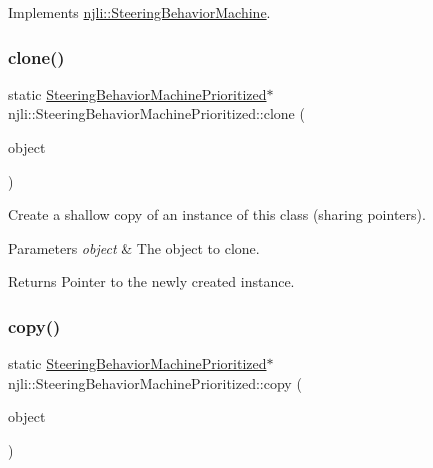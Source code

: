 Implements \mbox{\hyperlink{classnjli_1_1_steering_behavior_machine_aea431466acb4ef73220206bbcd515a9a}{njli\+::\+Steering\+Behavior\+Machine}}.

\mbox{\label{classnjli_1_1_steering_behavior_machine_prioritized_a5b86567620dab0bd1a238c222efcfd63}} 
\subsubsection{\texorpdfstring{clone()}{clone()}}
{\footnotesize\ttfamily static \mbox{\hyperlink{classnjli_1_1_steering_behavior_machine_prioritized}{Steering\+Behavior\+Machine\+Prioritized}}$\ast$ njli\+::\+Steering\+Behavior\+Machine\+Prioritized\+::clone (\begin{DoxyParamCaption}\item[{const \mbox{\hyperlink{classnjli_1_1_steering_behavior_machine_prioritized}{Steering\+Behavior\+Machine\+Prioritized}} \&}]{object }\end{DoxyParamCaption})\hspace{0.3cm}{\ttfamily [static]}}

Create a shallow copy of an instance of this class (sharing pointers).


\begin{DoxyParams}{Parameters}
{\em object} & The object to clone.\\
\hline
\end{DoxyParams}
\begin{DoxyReturn}{Returns}
Pointer to the newly created instance. 
\end{DoxyReturn}
\mbox{\label{classnjli_1_1_steering_behavior_machine_prioritized_a639b1ed7827dcf456f205d635632ae5f}} 
\subsubsection{\texorpdfstring{copy()}{copy()}}
{\footnotesize\ttfamily static \mbox{\hyperlink{classnjli_1_1_steering_behavior_machine_prioritized}{Steering\+Behavior\+Machine\+Prioritized}}$\ast$ njli\+::\+Steering\+Behavior\+Machine\+Prioritized\+::copy (\begin{DoxyParamCaption}\item[{const \mbox{\hyperlink{classnjli_1_1_steering_behavior_machine_prioritized}{Steering\+Behavior\+Machine\+Prioritized}} \&}]{object }\end{DoxyParamCaption})\hspace{0.3cm}{\ttfamily [static]}}

